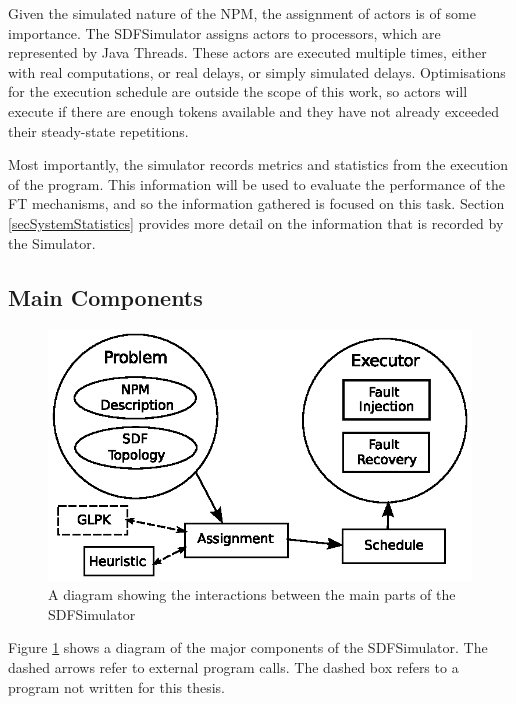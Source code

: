 Given the simulated nature of the NPM, the assignment of actors is of some importance.
The SDFSimulator assigns actors to processors, which are represented by Java Threads.
These actors are executed multiple times, either with real computations, or real delays, or simply simulated delays.
Optimisations for the execution schedule are outside the scope of this work, so actors will execute if there are enough tokens available and they have not already exceeded their steady-state repetitions.

Most importantly, the simulator records metrics and statistics from the execution of the program.
This information will be used to evaluate the performance of the FT mechanisms, and so the information gathered is focused on this task.
Section \ref{secSystemStatistics} provides more detail on the information that is recorded by the Simulator.

\subsection{Main Components}
\label{secSystemComponents}

\begin{figure}
\begin{center}
	\includegraphics[width=12cm]{figures/sysDiagram.eps}
\caption{A diagram showing the interactions between the main parts of the SDFSimulator}
\label{figSysDiag}
\end{center}
\end{figure}

Figure \ref{figSysDiag} shows a diagram of the major components of the SDFSimulator.
The dashed arrows refer to external program calls.
The dashed box refers to a program not written for this thesis.

